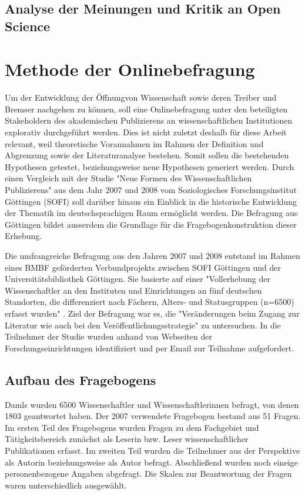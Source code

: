 \subsection{Analyse der Meinungen und Kritik an Open Science}

\section{Methode der Onlinebefragung}
Um der Entwicklung der Öffnungvon Wissenschaft sowie deren Treiber und Bremser nachgehen zu können, soll eine Onlinebefragung unter den beteiligten Stakeholdern des akademischen Publizierens an wissenschaftlichen Institutionen explorativ durchgeführt werden. Dies ist nicht zuletzt deshalb für diese Arbeit relevant, weil theoretische Vorannahmen im Rahmen der Definition und Abgrenzung sowie der Literaturanalyse bestehen. Somit sollen die bestehenden Hypothesen getestet, beziehungsweise neue Hypothesen generiert werden. Durch einen Vergleich mit der Studie "Neue Formen des Wissenschaftlichen Publizierens" aus dem Jahr 2007 und 2008 vom Soziologisches Forschungsinstitut Göttingen (SOFI) soll darüber hinaus ein Einblick in die historische Entwicklung der Thematik im deutschsprachigen Raum ermöglicht werden. Die Befragung aus Göttingen bildet ausserdem die Grundlage für die Fragebogenkonstruktion dieser Erhebung. 

Die umfrangreiche Befragung aus den Jahren 2007 und 2008 entstand im Rahmen eines BMBF geförderten Verbundprojekts zwischen SOFI Göttingen und der Universitätsbibliothek Göttingen. Sie basierte auf einer "Vollerhebung der Wissenschaftler an den Instituten und Einrichtungen an fünf deutschen Standorten, die differenziert nach Fächern, Alters- und Statusgruppen (n=6500) erfasst wurden" \cite{Hanekop_2014}. Ziel der Befragung war es, die "Veränderungen beim Zugang zur Literatur wie auch bei den Veröffentlichungsstrategie" \cite{Hanekop_Wittke_2007_Fragebogen} zu untersuchen. In die Teilnehmer der Studie wurden anhand von Webseiten der Forschungseinrichtungen identifiziert und per Email zur Teilnahme aufgefordert. 

\subsection{Aufbau des Fragebogens}
Damls wurden 6500 Wissenschaftler und Wissenschaftlerinnen befragt, von denen 1803 geantwortet haben. Der 2007 verwendete Fragebogen bestand aus 51 Fragen. Im ersten Teil des Fragebogens wurden Fragen zu dem Fachgebiet und Tätigkeitsbereich zunächst als Leserin bzw. Leser wissenschaftlicher Publikationen erfasst. Im zweiten Teil wurden die Teilnehmer aus der Perspektive als Autorin beziehungsweise als Autor befragt. Abschließend wurden noch eineige personenbezogene Angaben abgefragt. \cite{Hanekop_Wittke_2007_Fragebogen} Die Skalen zur Beantwortung der Fragen waren unterschiedlich ausgewählt. 

